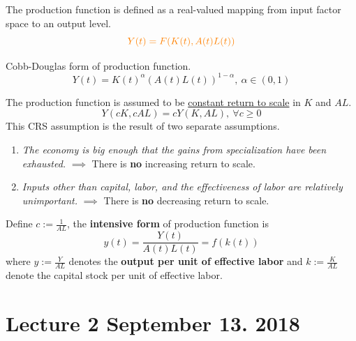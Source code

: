 \documentclass[11pt]{article}
\begin{document}
            \begin{definition}
                The production function is defined as a real-valued mapping from input factor space to an output level.
	            \begin{equation}
                    \textcolor{orange}{Y(t) = F(K(t), A(t)L(t))}
	            \end{equation}
            \end{definition}
            
            \begin{example}
            	    Cobb-Douglas form of production function.
                \[
                    Y(t) = K(t)^\alpha (A(t)L(t))^{1 - \alpha},\ \alpha \in (0, 1)
                \]
            \end{example}
            
            \begin{assumption} The production function is assumed to be \ul{constant return to scale} in $K$ and $AL$.
            \[
            	Y(cK, cAL) = cY(K, AL),\ \forall c \geq 0
            \]
           	This CRS assumption is the result of two separate assumptions.
           	\begin{enumerate}
           		\item \emph{The economy is big enough that the gains from specialization have been exhausted.} $\implies$ There is \textbf{no} increasing return to scale.
           		\item \emph{Inputs other than capital, labor, and the effectiveness of labor are relatively unimportant.} $\implies$ There is \textbf{no} decreasing return to scale.
           	\end{enumerate}
            \end{assumption}
            
            \begin{definition}
                Define $c := \frac{1}{AL}$, the \textbf{intensive form} of production function is
                \[
                    y(t) = \frac{Y(t)}{A(t)L(t)} = f(k(t))
                \]
                where $y := \frac{Y}{AL}$ denotes the \textbf{output per unit of effective labor} and $k := \frac{K}{AL}$ denote the capital stock per unit of effective labor.
            \end{definition}
	
	\section{Lecture 2 September 13. 2018}
\end{document}
